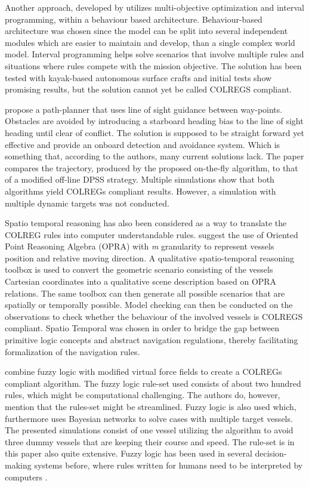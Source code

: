 Another approach, developed by \textcite{benjamin2004colregs,benjamin2006method} utilizes multi-objective optimization and interval programming, within a behaviour based architecture. Behaviour-based architecture was chosen since the model can be split into several independent modules which are easier to maintain and develop, than a single complex world model.  Interval programming helps solve scenarios that involve  multiple rules and situations where rules compete with the mission objective. The solution has been tested with kayak-based autonomous surface crafts and initial tests show promising results, but the solution cannot yet be called COLREGS compliant.


\textcite{naeem2012colregs}
propose a path-planner that uses line of sight guidance between way-points. Obstacles are avoided by introducing a starboard heading bias to the line of sight heading until clear of conflict. The solution is supposed to be straight forward yet effective and  provide an onboard detection and avoidance system. Which is something that, according to the authors, many current solutions lack. The paper compares the trajectory, produced by the proposed on-the-fly algorithm, to that of a modified off-line DPSS strategy. Multiple simulations show that both algorithms yield COLREGs compliant results. However, a simulation with multiple dynamic targets was not conducted.

Spatio temporal reasoning has also been considered as a way to translate the COLREG rules into computer understandable rules. \textcite{spat_temp1,spat_temp2}
suggest the use of Oriented Point Reasoning Algebra (OPRA) with \textit{m}  granularity to represent vessels position and relative moving direction.
A qualitative spatio-temporal reasoning toolbox is used to convert the geometric scenario consisting of the vessels Cartesian coordinates into a qualitative scene description based on OPRA relations. The same toolbox can then generate all possible scenarios that are spatially or temporally possible. Model checking can then be conducted on the  observations to check whether the behaviour of the involved vessels is  COLREGS compliant. Spatio Temporal was chosen in order to bridge the gap between primitive logic concepts and abstract navigation regulations, thereby facilitating formalization of the navigation rules.


\textcite{lee2004fuzzy} combine fuzzy logic with modified virtual force fields to  create a COLREGs compliant algorithm. The fuzzy logic rule-set used consists of about two hundred rules, which might be computational challenging. The authors do, however, mention that the rules-set might be streamlined. Fuzzy logic is also used \textcite{perera2012intelligent} which, furthermore uses Bayesian networks to solve cases with multiple target vessels. The presented simulations consist of one vessel utilizing the algorithm to avoid three dummy vessels that are keeping their course and speed. The rule-set is in this paper also quite extensive. Fuzzy logic has been used in several decision-making systems before, where rules written for humans need to be interpreted by computers \cite{perera2012intelligent}.


